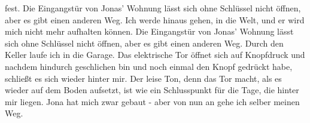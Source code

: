 fest. Die Eingangstür von Jonas' Wohnung lässt sich ohne Schlüssel nicht öffnen, aber es gibt einen anderen Weg. Ich werde hinaus gehen, in die Welt, und er wird mich nicht mehr aufhalten können. Die Eingangstür von Jonas' Wohnung lässt sich ohne Schlüssel nicht öffnen, aber es gibt einen anderen Weg. Durch den Keller laufe ich in die Garage. Das elektrische Tor öffnet sich auf Knopfdruck und nachdem hindurch geschlichen bin und noch einmal den Knopf gedrückt habe, schließt es sich wieder hinter mir. Der leise Ton, denn das Tor macht, als es wieder auf dem Boden aufsetzt, ist wie ein Schlusspunkt für die Tage, die hinter mir liegen. Jona hat mich zwar gebaut - aber von nun an gehe ich selber meinen Weg.